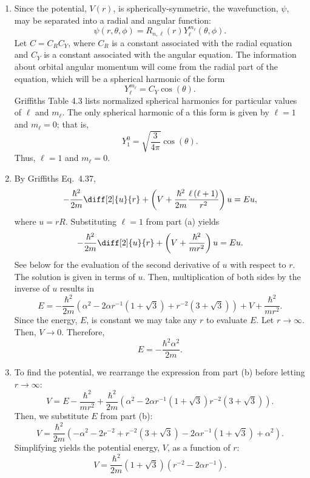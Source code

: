 \documentclass[a4paper, 12pt]{config/homework}
\begin{document}
\begin{enumerate}[label=(\alph*)]
\item Since the potential, \(V(r)\), is spherically-symmetric, the wavefunction, \(\psi\), may be separated into a radial and angular function:
\[\psi(r,\theta,\phi)=R_{n,\ell}(r)Y_\ell^{m_\ell}(\theta,\phi).\]
Let \(C=C_R C_Y\), where \(C_R\) is a constant associated with the radial equation and \(C_Y\) is a constant associated with the angular equation. The information about orbital angular momentum will come from the radial part of the equation, which will be a spherical harmonic of the form
\[Y_\ell^{m_\ell} = C_Y \cos\left(\theta\right).\]
Griffiths Table 4.3 lists normalized spherical harmonics for particular values of \(\ell\) and \(m_\ell\). The only spherical harmonic of a this form is given by \(\ell=1\) and \(m_\ell=0\); that is,
\[Y_1^0=\sqrt{\frac{3}{4\pi}} \cos\left(\theta\right).\]
Thus, \(\ell=1\) and \(m_\ell=0\).

\pagebreak
\item By Griffiths Eq.\ 4.37,
\[-\frac{\hbar^2}{2m}\diff[2]{u}{r}+\left(V+\frac{\hbar^2}{2m}\frac{\ell\left(\ell+1\right)}{r^2}\right)u=Eu,\]
where \(u=rR\). Substituting \(\ell=1\) from part (a) yields
\[-\frac{\hbar^2}{2m}\diff[2]{u}{r}+\left(V+\frac{\hbar^2}{mr^2}\right)u=Eu.\]
See below for the evaluation of the second derivative of \(u\) with respect to \(r\). The solution is given in terms of \(u\). Then, multiplication of both sides by the inverse of \(u\) results in
\[E = -\frac{\hbar^2}{2m}\left(\alpha^2 - 2\alpha r^{-1} \left(1+\sqrt{3}\right) + r^{-2}\left(3+\sqrt{3}\right)\right) + V + \frac{\hbar^2}{mr^2}.\]
Since the energy, \(E\), is constant we may take any \(r\) to evaluate \(E\). Let \(r\to\infty\). Then, \(V\to0\). Therefore,
\[E = -\frac{\hbar^2 \alpha^2}{2m}.\]


\bigskip
\item To find the potential, we rearrange the expression from part (b) before letting \(r\to\infty\):
\[V = E - \frac{\hbar^2}{mr^2} + \frac{\hbar^2}{2m}\left(\alpha^2 - 2\alpha r^{-1}\left(1+\sqrt{3}\right) r^{-2}\left(3+\sqrt{3}\right)\right).\]
Then, we substitute \(E\) from part (b):
\[V = \frac{\hbar^2}{2m}\left(-\alpha^2 - 2r^{-2} + r^{-2}\left(3 + \sqrt{3}\right) - 2\alpha r^{-1}\left(1 + \sqrt{3}\right) + \alpha^2\right).\]
Simplifying yields the potential energy, \(V\), as a function of \(r\):
\[V = \frac{\hbar^2}{2m}\left(1+\sqrt{3}\right)\left(r^{-2}-2\alpha r^{-1}\right).\]

\end{enumerate}
\end{document}

